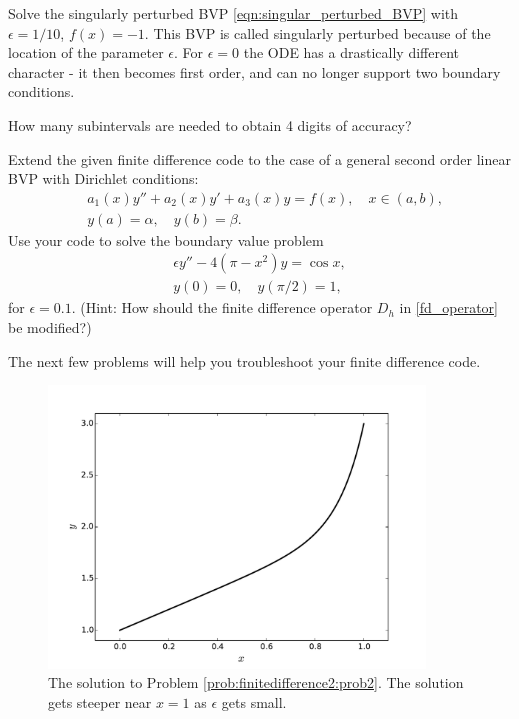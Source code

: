 \begin{problem}
Solve the singularly perturbed BVP \eqref{eqn:singular_perturbed_BVP} with $\epsilon = 1/10$, $f(x) = -1$.
This BVP is called singularly perturbed because of the location of the parameter $\epsilon$.
For $\epsilon = 0$ the ODE has a drastically different character - it then becomes first order, and can no longer support two boundary conditions.
	
How many subintervals are needed to obtain 4 digits of accuracy?
	\label{prob:finitedifference2:prob2}
\end{problem}



\begin{problem}
Extend the given finite difference code to the case of a general second order linear BVP with Dirichlet conditions:
\begin{align*}
	&{ } a_1(x)y'' +a_2(x)y'+ a_3(x) y = f(x), \quad x \in (a,b),\\
	&{ } y(a) = \alpha, \quad y(b) = \beta.
\end{align*}
Use your code to solve the boundary value problem
\begin{align*}
	\epsilon y'' - 4(\pi - x^2)y = \cos x, \\
	y(0) = 0, \quad y(\pi/2) = 1,
\end{align*}
for $\epsilon = 0.1$.
\label{prob:finitedifference2:prob3}
(Hint: How should the finite difference operator $D_h$ in \eqref{fd_operator} be modified?) 

The next few problems will help you troubleshoot your finite difference code. 
\end{problem}

\begin{figure}[h]
\centering
\includegraphics[width=10cm]{figure2.pdf}
\caption{The solution to Problem \ref{prob:finitedifference2:prob2}.
The solution gets steeper near $x = 1$ as $\epsilon $ gets small.}
\end{figure}

